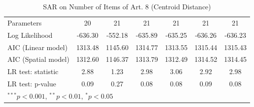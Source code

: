 \begin{table}[!h]
\begin{center}
\begin{tabular}{l c c c c c c }
Parameters              & 20           & 21           & 21           & 21           & 21           & 21           \\
Log Likelihood          & -636.30      & -552.18      & -635.89      & -635.25      & -636.26      & -636.23      \\
AIC (Linear model)      & 1313.48      & 1145.60      & 1314.77      & 1313.55      & 1315.44      & 1315.43      \\
AIC (Spatial model)     & 1312.60      & 1146.37      & 1313.79      & 1312.49      & 1314.52      & 1314.45      \\
LR test: statistic      & 2.88         & 1.23         & 2.98         & 3.06         & 2.92         & 2.98         \\
LR test: p-value        & 0.09         & 0.27         & 0.08         & 0.08         & 0.09         & 0.08         \\
\bottomrule
\multicolumn{7}{l}{\scriptsize{$^{***}p<0.001$, $^{**}p<0.01$, $^*p<0.05$}}
\end{tabular}
\caption{SAR on Number of Items of Art. 8 (Centroid Distance)}
\label{table:coefficients}
\end{center}
\end{table}
